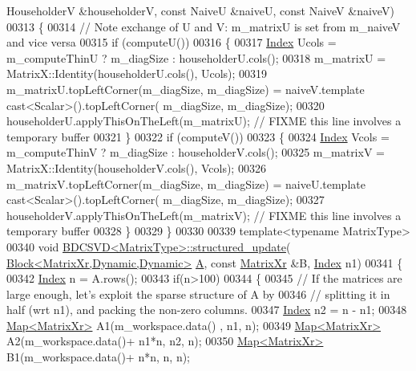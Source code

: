\begin{DoxyCode}
      HouseholderV &householderV, \textcolor{keyword}{const} NaiveU &naiveU, \textcolor{keyword}{const} NaiveV &naiveV)
00313 \{
00314   \textcolor{comment}{// Note exchange of U and V: m\_matrixU is set from m\_naiveV and vice versa}
00315   \textcolor{keywordflow}{if} (computeU())
00316   \{
00317     \hyperlink{namespace_eigen_a62e77e0933482dafde8fe197d9a2cfde}{Index} Ucols = m\_computeThinU ? m\_diagSize : householderU.cols();
00318     m\_matrixU = MatrixX::Identity(householderU.cols(), Ucols);
00319     m\_matrixU.topLeftCorner(m\_diagSize, m\_diagSize) = naiveV.template cast<Scalar>().topLeftCorner(
      m\_diagSize, m\_diagSize);
00320     householderU.applyThisOnTheLeft(m\_matrixU); \textcolor{comment}{// FIXME this line involves a temporary buffer}
00321   \}
00322   \textcolor{keywordflow}{if} (computeV())
00323   \{
00324     \hyperlink{namespace_eigen_a62e77e0933482dafde8fe197d9a2cfde}{Index} Vcols = m\_computeThinV ? m\_diagSize : householderV.cols();
00325     m\_matrixV = MatrixX::Identity(householderV.cols(), Vcols);
00326     m\_matrixV.topLeftCorner(m\_diagSize, m\_diagSize) = naiveU.template cast<Scalar>().topLeftCorner(
      m\_diagSize, m\_diagSize);
00327     householderV.applyThisOnTheLeft(m\_matrixV); \textcolor{comment}{// FIXME this line involves a temporary buffer}
00328   \}
00329 \}
00330 
00339 \textcolor{keyword}{template}<\textcolor{keyword}{typename} MatrixType>
00340 \textcolor{keywordtype}{void} \hyperlink{group___s_v_d___module_class_eigen_1_1_b_d_c_s_v_d}{BDCSVD<MatrixType>::structured\_update}(
      \hyperlink{group___core___module_class_eigen_1_1_block}{Block<MatrixXr,Dynamic,Dynamic>} \hyperlink{group___core___module_class_eigen_1_1_matrix}{A}, \textcolor{keyword}{const} 
      \hyperlink{group___core___module}{MatrixXr} &B, \hyperlink{namespace_eigen_a62e77e0933482dafde8fe197d9a2cfde}{Index} n1)
00341 \{
00342   \hyperlink{namespace_eigen_a62e77e0933482dafde8fe197d9a2cfde}{Index} n = A.rows();
00343   \textcolor{keywordflow}{if}(n>100)
00344   \{
00345     \textcolor{comment}{// If the matrices are large enough, let's exploit the sparse structure of A by}
00346     \textcolor{comment}{// splitting it in half (wrt n1), and packing the non-zero columns.}
00347     \hyperlink{namespace_eigen_a62e77e0933482dafde8fe197d9a2cfde}{Index} n2 = n - n1;
00348     \hyperlink{group___core___module_class_eigen_1_1_map}{Map<MatrixXr>} A1(m\_workspace.data()      , n1, n);
00349     \hyperlink{group___core___module_class_eigen_1_1_map}{Map<MatrixXr>} A2(m\_workspace.data()+ n1*n, n2, n);
00350     \hyperlink{group___core___module_class_eigen_1_1_map}{Map<MatrixXr>} B1(m\_workspace.data()+  n*n, n,  n);

\end{DoxyCode}
